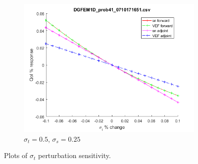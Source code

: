 \documentclass{article}
\newcommand{\sigt}{\sigma_t}
\newcommand{\sigs}{\sigma_s}
\begin{document}
\begin{figure}[H]
\begin{subfigure}{.5\textwidth}
\end{subfigure}
\begin{subfigure}{.5\textwidth}
  \centering
  \includegraphics[width=.8\linewidth]{figures/41sigtSens.png}
  \caption{$\sigt=0.5$, $\sigs=0.25$}
  \label{fig:sfig3}
\end{subfigure}
\caption{Plots of $\sigt$ perturbation sensitivity.}
\label{fig:fig}
\end{figure}
\end{document}
